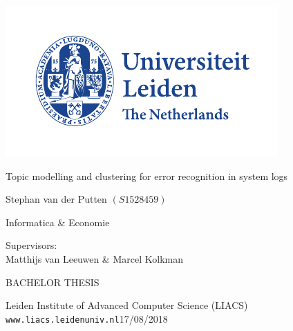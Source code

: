 \thispagestyle{empty}

\includegraphics{logoleiden}


\vspace{-2.5cm}\hfill {}

\vspace{3cm}
\begin{Large}
\hfill Topic modelling and clustering for error recognition in system logs


\vspace*{14mm}

\hfill Stephan van der Putten $(S1528459)$ 
\begin{flushright} Informatica \& Economie \end{flushright}
\end{Large}


\begin{large}

\vspace{2.8cm}
Supervisors:\\
Matthijs van Leeuwen \& Marcel Kolkman


\vspace*{2.8cm}

BACHELOR THESIS

\vspace*{5mm}
Leiden Institute of Advanced Computer Science (LIACS)\\
\texttt{www.liacs.leidenuniv.nl}\hfill 17/08/2018
\end{large}

